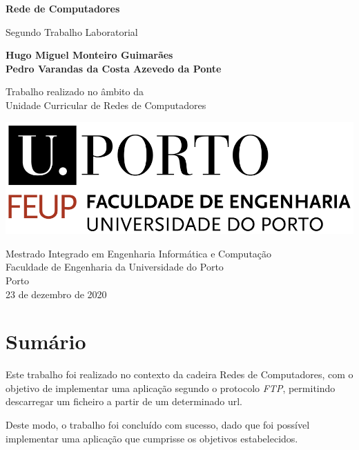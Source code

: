 \documentclass[11pt]{article}
\begin{document}
\begin{titlepage}
	\begin{center}
		\vspace*{1cm}
		
		\Large
		\textbf{Rede de Computadores}
		
		\vspace{0.5cm}
		\large
		Segundo Trabalho Laboratorial
		
		\vspace{1.5cm}
		
		\textbf{Hugo Miguel Monteiro Guimarães}\\
		\textbf{Pedro Varandas da Costa Azevedo da Ponte}
		
		\vspace{5cm}
		
		Trabalho realizado no âmbito da\\
		Unidade Curricular de Redes de Computadores
		
		\vspace{0.8cm}
	
		\includegraphics[width=0.4 \textwidth]{feup_logo.png}
		
		\vspace{1.5cm}		
		
		\large
		Mestrado Integrado em Engenharia Informática e Computação\\
		Faculdade de Engenharia da Universidade do Porto\\
		Porto\\
		23 de dezembro de 2020
	
	\end{center}
\end{titlepage}


\pagebreak
\tableofcontents

\pagebreak


\section*{Sumário}
Este trabalho foi realizado no contexto da cadeira Redes de Computadores, com o objetivo de implementar uma aplicação segundo o protocolo \emph{FTP}, permitindo descarregar um ficheiro a partir de um determinado url.
 
Deste modo, o trabalho foi concluído com sucesso, dado que foi possível implementar uma aplicação que cumprisse os objetivos estabelecidos.
\end{document}
